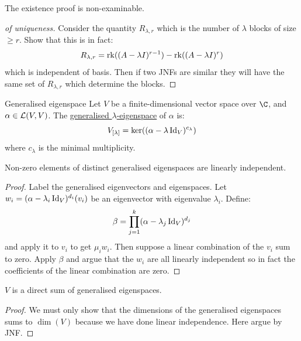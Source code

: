 \documentclass[../Main.tex]{subfiles}
\begin{document}
The existence proof is non-examinable.
\begin{proof}[of uniqueness]
    Consider the quantity $R_{\lambda, r}$ which is the number of $\lambda$ blocks of size $\geq r$. Show that this is in fact:
    \begin{equation*}
        R_{\lambda, r} = \operatorname{rk}((A - \lambda I)^{r-1}) - \operatorname{rk}((A - \lambda I)^r)
    \end{equation*}
    which is independent of basis. Then if two JNFs are similar they will have the same set of $R_{\lambda, r}$ which determine the blocks.
\end{proof}
\begin{definition}{Generalised eigenspace}
    Let $V$ be a finite-dimensional vector space over $\C$, and $\alpha \in \mathcal{L}(V, V)$. The \underline{generalised $\lambda$-eigenspace} of $\alpha$ is:
    \begin{equation*}
        {V}_{[\lambda]} = \ker((\alpha - \lambda \operatorname{Id}_V)^{c_\lambda})
    \end{equation*}
    where $c_\lambda$ is the minimal multiplicity.
\end{definition}
\begin{lemma}
    Non-zero elements of distinct generalised eigenspaces are linearly independent.
    \label{lemGESpaceLIVectors}
\end{lemma}
\begin{proof}
    Label the generalised eigenvectors and eigenspaces. Let $w_i = (\alpha - \lambda_i \operatorname{Id}_V)^{d_i}(v_i)$ be an eigenvector with eigenvalue $\lambda_i$. Define:
    \begin{equation*}
        \beta = \prod_{j=1}^k (\alpha - \lambda_j \operatorname{Id}_V)^{d_j}
    \end{equation*}
    and apply it to $v_i$ to get $\mu_i w_i$. Then suppose a linear combination of the $v_i$ sum to zero. Apply $\beta$ and argue that the $w_i$ are all linearly independent so in fact the coefficients of the linear combination are zero.
\end{proof}
\begin{theorem}
    $V$ is a direct sum of generalised eigenspaces.
    \label{thmGEDecompose}
\end{theorem}
\begin{proof}
    We must only show that the dimensions of the generalised eigenspaces sums to $\dim(V)$ because we have done linear independence. Here argue by JNF.
\end{proof}
\end{document}
